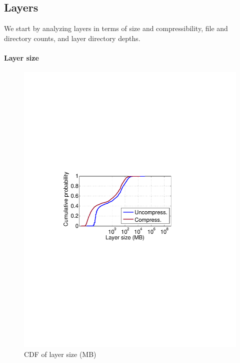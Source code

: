 \subsection{Layers}
\label{sec:layers}

We start by analyzing layers in terms of size and compressibility, file and directory
counts, and layer directory depths. 

\paragraph{Layer size}


\begin{figure}[t]
	\centering
	\begin{minipage}{0.22\textwidth}
		\centering
		\includegraphics[width=1\textwidth]{graphs/layer-size-cdf.pdf}
		\caption{CDF of layer size (MB)}
		\label{fig:layer-size-cdf}
	\end{minipage}%
	\begin{minipage}{0.22\textwidth}
		\centering

\end{minipage}
\end{figure}

